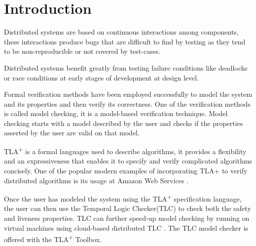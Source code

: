 \documentclass{thesul}
\newcommand{\tlaplus}{TLA\textsuperscript{+}\xspace}
\begin{document}
\WritePartLabelInToc
\WriteChapterLabelInToc


\tableofcontents

\NoChapterHead


\mainmatter


\chapter{Introduction}

Distributed systems are based on continuous interactions among components, these interactions produce bugs that are difficult to find by testing as they tend to be non-reproducible or not covered by test-cases.

Distributed systems benefit greatly from testing failure conditions like deadlocks or race conditions at early stages of development at design level.

Formal verification methods have been employed successfully to model the system and its properties and then verify its correctness. One of the verification methods is called model checking, it is a model-based verification technique. Model checking starts with a model described by the user and checks if the properties asserted by the user are valid on that model. 

\tlaplus is a formal languages used to describe algorithms, it provides a flexibility and an expressiveness that enables it to specify and verify complicated algorithms concisely. One of the popular modern examples of incorporating TLA+ to verify distributed algorithms is its usage at Amazon Web Services \cite{amazon}.

Once the user has modeled the system using the \tlaplus specification language, the user can then use the Temporal Logic Checker(TLC) to check both the safety and liveness properties. TLC can further speed-up model checking by running on virtual machines using cloud-based distributed TLC \cite{cloudTLC}. The TLC model checker is offered with the \tlaplus Toolbox. 
\end{document}
